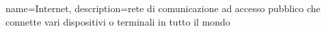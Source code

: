{
	name={Internet},
	description={rete di comunicazione ad accesso pubblico che connette vari dispositivi o terminali in tutto il mondo}
}